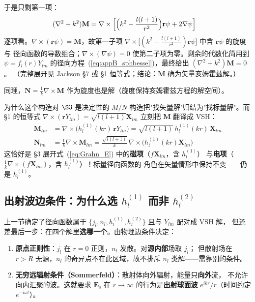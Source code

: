 于是只剩第一项：
\begin{align}
  (\nabla^2+k^2)\mathbf{M}
  &= \nabla\times\Bigl[\Bigl(k^2-\frac{l(l+1)}{r^2}\Bigr)\mathbf{r}\psi + 2\nabla\psi\Bigr]
\end{align}
逐项看。$\nabla\times(\mathbf{r}\psi)=\mathbf{M}$，故第一子项
$\nabla\times\bigl[(k^2-\frac{l(l+1)}{r^2})\mathbf{r}\psi\bigr]$ 中含 $\mathbf{r}\psi$ 的旋度与
径向函数的导数组合；$\nabla\times(\nabla\psi)=0$ 使第二子项为零。剩余的代数化简用到
$\psi=f_l(r)Y_{lm}$ 的径向方程~(\ref{eq:appB_sphbessel})，最终给出 $(\nabla^2+k^2)\mathbf{M}=0$。
（完整展开见 Jackson \S7 或 \S1 恒等式；结论：$\mathbf{M}$ 确为矢量亥姆霍兹解。）

同理，$\mathbf{N}=\frac1k\nabla\times\mathbf{M}$ 作为旋度也是解（旋度保持亥姆霍兹方程的解空间）。
\checkmark

\begin{stepbox}{为什么这个构造对 $\S3$ 是决定性的}
$M/N$ 构造把"找矢量解"归结为"找标量解"。而 \S1 的恒等式
$\nabla\times(\mathbf{r}Y_{lm})=\sqrt{l(l+1)}\mathbf{X}_{lm}$ 立刻把 $\mathbf{M}$ 翻译成 VSH：
\begin{align}
  \mathbf{M}_{lm} &= \nabla\times\bigl(h_l^{(1)}(kr)\,\mathbf{r}Y_{lm}\bigr)
    = \sqrt{l(l+1)}\,h_l^{(1)}(kr)\,\mathbf{X}_{lm} \label{eq:appB_M_vsh}\\
  \mathbf{N}_{lm} &= \frac{1}{k}\nabla\times\mathbf{M}_{lm}
    = \frac{\sqrt{l(l+1)}}{k}\,\nabla\times\bigl(h_l^{(1)}(kr)\mathbf{X}_{lm}\bigr) \label{eq:appB_N_vsh}
\end{align}
这恰好是 \S3 展开式~(\ref{eq:Grahn_E}) 中的\textbf{磁项}（$f\mathbf{X}_{lm}$，含 $h_l^{(1)}$）
与\textbf{电项}（$\frac1k\nabla\times(f\mathbf{X}_{lm})$，含 $h_l^{(1)}$）！标量径向函数的
角色在矢量情形中保持不变——仍是 $h_l^{(1)}$。
\end{stepbox}

\subsection{出射波边条件：为什么选 $h_l^{(1)}$ 而非 $h_l^{(2)}$}

上一节确定了径向函数属于 $\{j_l,n_l,h_l^{(1)},h_l^{(2)}\}$ 且与 $Y_{lm}$ 配对成 VSH 解，
但还差最后一步：在四个解里\textbf{选哪一个}。由物理边条件决定：

\begin{enumerate}
  \item \textbf{原点正则性}：$j_l$ 在 $r=0$ 正则，$n_l$ 发散。对\textbf{源内部}场取 $j_l$；
    但散射场在 $r>R$ 无源，$n_l$ 的奇异点不在此区域，故不排斥 $n_l$ 类解——需靠别的条件。
  \item \textbf{无穷远辐射条件（Sommerfeld）}：散射体向外辐射，能量只\textbf{向外}流，
    不允许向内汇聚的波。这就要求 $\mathbf{E}_s$ 在 $r\to\infty$ 的行为是\textbf{出射球面波}
    $e^{ikr}/r$（时间约定 $e^{-i\omega t}$）。
\end{enumerate}

